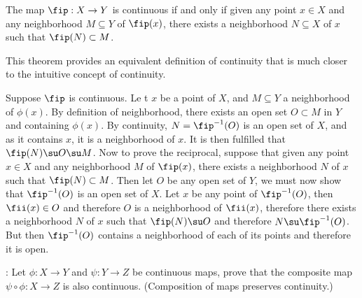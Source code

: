\bteo The map $\fip:X \to Y$ is continuous if and only if given any point $x \in X$ and any neighborhood $M \subseteq Y$ of $\fip(x)$, there exists a neighborhood $N \subseteq X$ of $x$ such that $\fip(N) \subset M$. \eteo

This theorem provides an equivalent definition of continuity that is much closer to the intuitive concept of continuity.

\bpru

Suppose $\fip$ is continuous. Le    t $x$ be a point of $X$, and $M \subseteq Y$ a neighborhood of $\phi(x)$. By definition of neighborhood, there exists an open set $O \subset M$ in $Y$ and containing $\phi(x)$. By continuity, $N = \fip^{-1}(O)$ is an open set of $X$, and as it contains $x$, it is a neighborhood of $x$. It is then fulfilled that $\fip(N) \su O \su M$. Now to prove the reciprocal, suppose that given any point $x \in X$ and any neighborhood $M$ of $\fip(x)$, there exists a neighborhood $N$ of $x$ such that $\fip(N) \subset M$. Then let $O$ be any open set of $Y$, we must now show that $\fip^{-1}(O)$ is an open set of $X$. Let $x$ be any point of $\fip^{-1}(O)$, then $\fii (x) \in O$ and therefore $O$ is a neighborhood of $\fii (x)$, therefore there exists a neighborhood $N$ of $x$ such that $\fip(N) \su O$ and therefore $N \su \fip^{-1}(O)$. But then $\fip^{-1}(O)$ contains a neighborhood of each of its points and therefore it is open.
\epru

\ejer: Let $\phi : X \to Y$ and $\psi : Y \to Z$ be continuous maps, prove that the composite map $\psi \circ \phi : X \to Z$ is also continuous. (Composition of maps preserves continuity.)

\espa %

